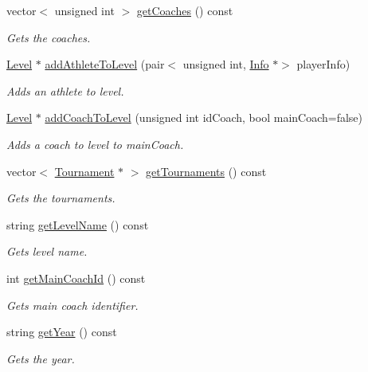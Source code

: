 \begin{DoxyCompactItemize}
vector$<$ unsigned int $>$ \hyperlink{class_level_a2130d8ee6b56f18821e5606c757661d3}{get\+Coaches} () const
\begin{DoxyCompactList}\small\item\em Gets the coaches. \end{DoxyCompactList}\item 
\hyperlink{class_level}{Level} $\ast$ \hyperlink{class_level_a5c9636031654943ea260c22fe5dede44}{add\+Athlete\+To\+Level} (pair$<$ unsigned int, \hyperlink{class_info}{Info} $\ast$$>$ player\+Info)
\begin{DoxyCompactList}\small\item\em Adds an athlete to level. \end{DoxyCompactList}\item 
\hyperlink{class_level}{Level} $\ast$ \hyperlink{class_level_ae0c356fc3ffa08c834d4a9ea3d7bacc8}{add\+Coach\+To\+Level} (unsigned int id\+Coach, bool main\+Coach=false)
\begin{DoxyCompactList}\small\item\em Adds a coach to level to \textquotesingle{}main\+Coach\textquotesingle{}. \end{DoxyCompactList}\item 
vector$<$ \hyperlink{class_tournament}{Tournament} $\ast$ $>$ \hyperlink{class_level_ad01baca6bdb906c6d605f04f6885cb81}{get\+Tournaments} () const
\begin{DoxyCompactList}\small\item\em Gets the tournaments. \end{DoxyCompactList}\item 
string \hyperlink{class_level_a810328bff045bfb02159d388414718d8}{get\+Level\+Name} () const
\begin{DoxyCompactList}\small\item\em Gets level name. \end{DoxyCompactList}\item 
int \hyperlink{class_level_afda6ab0cbba0cea709e2fb04cdc0187a}{get\+Main\+Coach\+Id} () const
\begin{DoxyCompactList}\small\item\em Gets main coach identifier. \end{DoxyCompactList}\item 
string \hyperlink{class_level_a22837fd78482f7a7451cb228fe6595d2}{get\+Year} () const
\begin{DoxyCompactList}\small\item\em Gets the year. \end{DoxyCompactList}\item 
$$
\end{DoxyCompactItemize}
